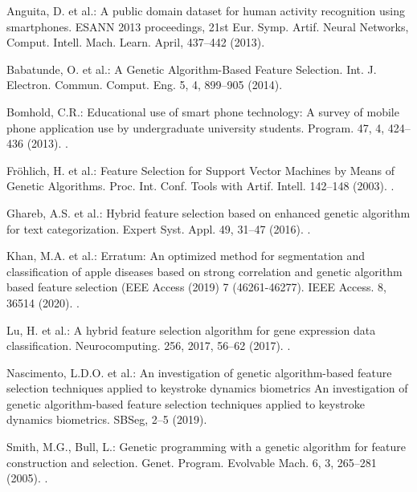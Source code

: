 \documentclass[runningheads]{llncs}
\begin{document}
\begin{thebibliography}{8}

Anguita, D. et al.: A public domain dataset for human activity recognition using smartphones. ESANN 2013 proceedings, 21st Eur. Symp. Artif. Neural Networks, Comput. Intell. Mach. Learn. April, 437–442 (2013).

Babatunde, O. et al.: A Genetic Algorithm-Based Feature Selection. Int. J. Electron. Commun. Comput. Eng. 5, 4, 899–905 (2014).

Bomhold, C.R.: Educational use of smart phone technology: A survey of mobile phone application use by undergraduate university students. Program. 47, 4, 424–436 (2013). .

Fröhlich, H. et al.: Feature Selection for Support Vector Machines by Means of Genetic Algorithms. Proc. Int. Conf. Tools with Artif. Intell. 142–148 (2003). .

Ghareb, A.S. et al.: Hybrid feature selection based on enhanced genetic algorithm for text categorization. Expert Syst. Appl. 49, 31–47 (2016). .

Khan, M.A. et al.: Erratum: An optimized method for segmentation and classification of apple diseases based on strong correlation and genetic algorithm based feature selection (EEE Access (2019) 7 (46261-46277). IEEE Access. 8, 36514 (2020). .

Lu, H. et al.: A hybrid feature selection algorithm for gene expression data classification. Neurocomputing. 256, 2017, 56–62 (2017). .

Nascimento, L.D.O. et al.: An investigation of genetic algorithm-based feature selection techniques applied to keystroke dynamics biometrics An investigation of genetic algorithm-based feature selection techniques applied to keystroke dynamics biometrics. SBSeg, 2–5 (2019).

Smith, M.G., Bull, L.: Genetic programming with a genetic algorithm for feature construction and selection. Genet. Program. Evolvable Mach. 6, 3, 265–281 (2005). .


\end{thebibliography}
\end{document}
